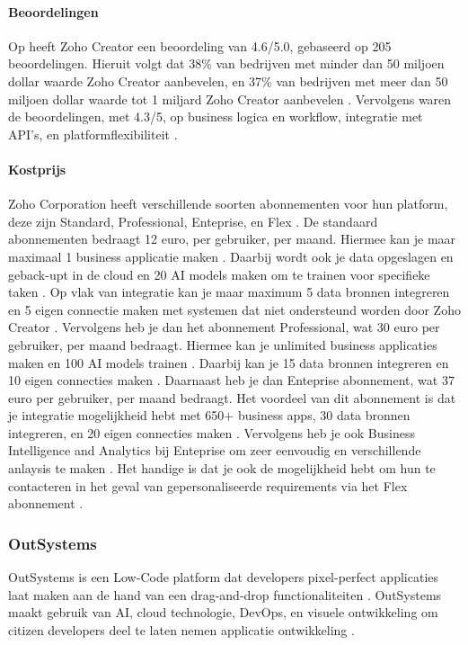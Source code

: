 \paragraph{Beoordelingen}
Op \textcite{Gartner2024} heeft Zoho Creator een beoordeling van 4.6/5.0, gebaseerd op 205 beoordelingen. Hieruit volgt dat 38\% van bedrijven met minder dan 50 miljoen dollar waarde Zoho Creator aanbevelen, 
en 37\% van bedrijven met meer dan 50 miljoen dollar waarde tot 1 miljard Zoho Creator aanbevelen \autocite{Gartner2024}. Vervolgens waren de beoordelingen, met 4.3/5, op business logica en workflow, integratie met API's, en platformflexibiliteit \autocite{Gartner2024}.
\paragraph{Kostprijs}
Zoho Corporation heeft verschillende soorten abonnementen voor hun platform, deze zijn Standard, Professional, Enteprise, en Flex \autocite{ZohoCorporation2024}.
De standaard abonnementen bedraagt 12 euro, per gebruiker, per maand. Hiermee kan je maar maximaal 1 business applicatie maken \autocite{ZohoCorporation2024}.
Daarbij wordt ook je data opgeslagen en geback-upt in de cloud en 20 AI models maken om te trainen voor specifieke taken \autocite{ZohoCorporation2024}. Op vlak van integratie
kan je maar maximum 5 data bronnen integreren en 5 eigen connectie maken met systemen dat niet ondersteund worden door Zoho Creator \autocite{ZohoCorporation2024}. Vervolgens heb je dan het
abonnement Professional, wat 30 euro per gebruiker, per maand bedraagt. Hiermee kan je unlimited business applicaties maken en 100 AI models trainen \autocite{ZohoCorporation2024}. 
Daarbij kan je 15 data bronnen integreren en 10 eigen connecties maken \autocite{ZohoCorporation2024}. Daarnaast heb je dan Enteprise abonnement, wat 37 euro per gebruiker, per maand bedraagt.
Het voordeel van dit abonnement is dat je integratie mogelijkheid hebt met 650+ business apps, 30 data bronnen integreren, en 20 eigen connecties maken \autocite{ZohoCorporation2024}. Vervolgens heb je ook
Business Intelligence and Analytics bij Enteprise om zeer eenvoudig en verschillende anlaysis te maken \autocite{ZohoCorporation2024}. Het handige is dat je ook de mogelijkheid hebt om hun te contacteren in het geval 
van gepersonaliseerde requirements via het Flex abonnement \autocite{ZohoCorporation2024}.

\subsubsection*{OutSystems}
OutSystems is een Low-Code platform dat developers pixel-perfect applicaties laat maken aan de hand van een drag-and-drop functionaliteiten \autocite{Ranosys2023} \autocite{Payne2023}.
OutSystems maakt gebruik van AI, cloud technologie, DevOps, en visuele ontwikkeling om citizen developers deel te laten nemen applicatie ontwikkeling \autocite{Ranosys2023}.

